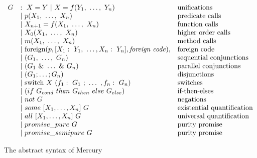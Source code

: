 \begin{figure}
\[
\begin{array}{lll}
G
    & :~ X = Y ~|~ X = f(Y_1,~\ldots,~Y_n)
        & \hbox{unifications}\\
    & |~ p(X_1,~\ldots,~X_n)
        & \hbox{predicate calls} \\
    & |~ X_{n+1} = f(X_1,~\ldots,~X_n)
        & \hbox{function calls} \\
    & |~ X_0(X_1,~\ldots,~X_n)
        & \hbox{higher order calls} \\
    & |~ m(X_1,~\ldots,~X_n)
        & \hbox{method calls} \\
    & |~ \hbox{foreign}(p,
        [X_1:~Y_1,~\ldots,X_n:~Y_n],
        \hbox{\emph{foreign code}}),
        & \hbox{foreign code} \\
    & |~ (G_1,~\ldots,~G_n)
        & \hbox{sequential conjunctions}\\
    & |~ (G_1~\&~\ldots~\&~G_n)
        & \hbox{parallel conjunctions}\\
    & |~ (G_1 ; \ldots ; G_n)
        & \hbox{disjunctions}\\
    & |~ \hbox{switch}~X~(f_1:~G_1~;~\ldots~,f_n:~G_n)
        & \hbox{switches}\\
    & |~ (if~G_{cond}~then~G_{then}~else~G_{else})
        & \hbox{if-then-elses}\\
    & |~ not~G
        & \hbox{negations}\\
    & |~ some~[X_1,\ldots,X_n]~G
        & \hbox{existential quantification}\\
    & |~ all~[X_1,\ldots,X_n]~G
        & \hbox{universal quantification} \\
    & |~ promise\_pure~G
        & \hbox{purity promise}\\
    & |~ promise\_semipure~G
        & \hbox{purity promise}\\
\end{array}
\]
\caption{The abstract syntax of Mercury}
\label{fig:abstractsyntax}
\end{figure}

